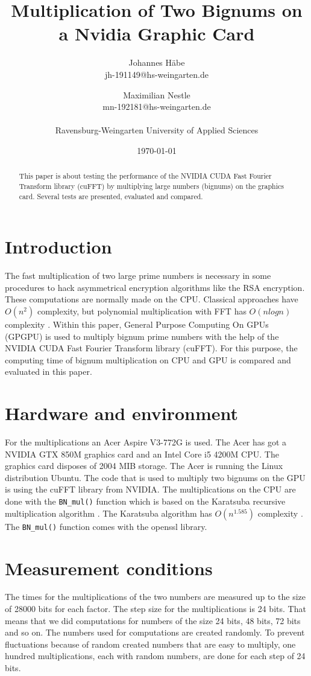 \documentclass[12pt,a4paper]{article}
\title{Multiplication of Two Bignums on a Nvidia Graphic Card}
\author{Johannes H\"abe  \\
	jh-191149@hs-weingarten.de
	\and 
	Maximilian Nestle \\
	mn-192181@hs-weingarten.de \\\\
	Ravensburg-Weingarten University of Applied Sciences
	}
\date{\today}
\begin{document}
\maketitle
%
\begin{abstract}
This paper is about testing the performance of the NVIDIA CUDA Fast Fourier Transform library (cuFFT) by multiplying large numbers (bignums) on the graphics card. Several tests are presented, evaluated and compared.
\end{abstract}

\section{Introduction}
The fast multiplication of two large prime numbers is necessary in some procedures to hack asymmetrical encryption algorithms like the RSA encryption. These computations are normally made on the CPU. Classical approaches have $O(n^2)$ complexity, but polynomial multiplication with FFT has $O(nlogn)$ complexity \cite{bantikyan2014big}. Within this paper, General Purpose Computing On GPUs (GPGPU) is used to multiply bignum prime numbers with the help of the NVIDIA CUDA Fast Fourier Transform library (cuFFT). For this purpose, the computing time of bignum multiplication on CPU and GPU is compared and evaluated in this paper.

\section{Hardware and environment}
For the multiplications an Acer Aspire V3-772G is used. The Acer has got a NVIDIA GTX 850M graphics card and an Intel Core i5 4200M CPU. The graphics card disposes of 2004 MIB storage. The Acer is running the Linux distribution Ubuntu. The code that is used to multiply two bignums on the GPU is using the cuFFT library from NVIDIA. The multiplications on the CPU are done with the \texttt{BN_mul()} function which is based on the Karatsuba recursive multiplication algorithm \cite{young1995bnmul}. The Karatsuba algorithm has $O(n^{1.585})$ complexity \cite{dietzfelbinger2012eff}. The \texttt{BN_mul()} function comes with the openssl library.

\section{Measurement conditions}
The times for the multiplications of the two numbers are measured up to the size of 28000 bits for each factor. The step size for the multiplications is 24 bits. That means that we did computations for numbers of the size 24 bits, 48 bits, 72 bits and so on. The numbers used for computations are created randomly. To prevent fluctuations because of random created numbers that are easy to multiply, one hundred multiplications, each with random numbers, are done for each step of 24 bits.
\end{document}
